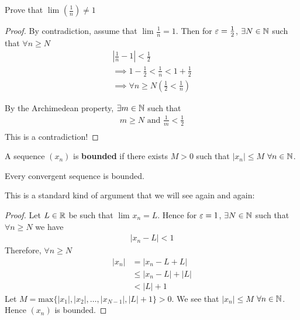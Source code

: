 \begin{eg}
	Prove that $\lim_{} \left( \frac{1}{n} \right) \neq 1$
\end{eg}

\begin{proof}
	By contradiction, assume that $\lim_{} \frac{1}{n} = 1$. Then for $\e = \frac{1}{2}$, $\exists N \in \mathbb{N}$ such that $\forall n \ge N$ 
	\begin{align}
		\left|\frac{1}{n} - 1\right| < \frac{1}{2} \\
		\implies 1 - \frac{1}{2} < \frac{1}{n} < 1 + \frac{1}{2} \\
		\implies \forall n \ge N \left( \frac{1}{2} < \frac{1}{n} \right)
	\end{align}

	By the Archimedean property, $\exists m \in \mathbb{N}$ such that
	\begin{align}
		m  \ge N \text{ and } \frac{1}{m} < \frac{1}{2} \\
	\end{align}
	This is a contradiction!
\end{proof}

\begin{definition}
	A sequence $\left( x_n \right) $ is \textbf{bounded} if there exists $M > 0$ such that $\left|x_n\right| \le M$ $\forall n \in \mathbb{N}$.
\end{definition}

\begin{theorem}
	Every convergent sequence is bounded.
\end{theorem}

This is a standard kind of argument that we will see again and again:

\begin{proof}
	Let $L \in \mathbb{R}$ be such that $\lim_{} x_n = L$. Hence for $\e = 1$, $\exists N \in \mathbb{N}$ such that $\forall n \ge N$ we have
	\begin{align}
		\left|x_n - L\right| < 1
	\end{align}
	Therefore, $\forall n \ge N$ 
	\begin{align}
		\left|x_n\right| &= \left|x_n - L + L\right| \\
				 &\le  \left|x_n - L\right|+ \left|L\right| \\
				 &< \left|L\right| + 1
	\end{align}
	Let $M = \text{max}\{\left|x_1\right|, \left|x_2\right|, \ldots, \left|x_{N-1}\right|, \left|L\right| + 1\} > 0$. We see that $\left|x_n\right| \le M$ $\forall n \in \mathbb{N}$. Hence $\left( x_n \right)$ is bounded.
\end{proof}












